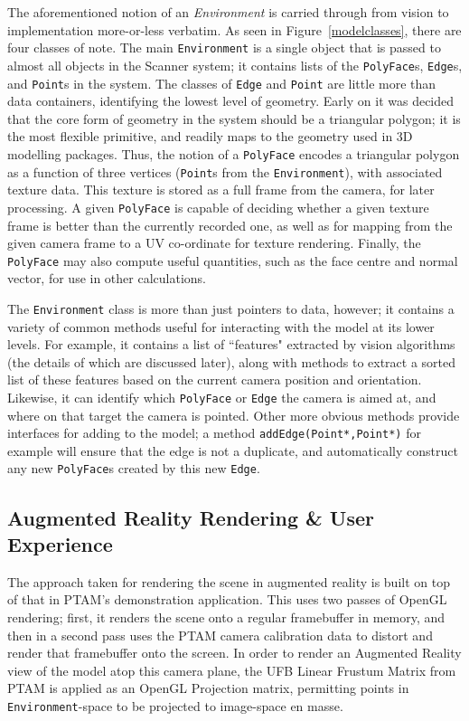 \documentclass[a4paper,10pt]{article}
\begin{document}
The aforementioned notion of an \textit{Environment} is carried through from vision to implementation more-or-less verbatim. As seen in Figure~\ref{modelclasses}, there are four classes of note. The main \texttt{Environment} is a single object that is passed to almost all objects in the Scanner system; it contains lists of the \texttt{PolyFace}s, \texttt{Edge}s, and \texttt{Point}s in the system. The classes of \texttt{Edge} and \texttt{Point} are little more than data containers, identifying the lowest level of geometry. Early on it was decided that the core form of geometry in the system should be a triangular polygon; it is the most flexible primitive, and readily maps to the geometry used in 3D modelling packages. Thus, the notion of a \texttt{PolyFace} encodes a triangular polygon as a function of three vertices (\texttt{Point}s from the \texttt{Environment}), with associated texture data. This texture is stored as a full frame from the camera, for later processing. A given \texttt{PolyFace} is capable of deciding whether a given texture frame is better than the currently recorded one, as well as for mapping from the given camera frame to a UV co-ordinate for texture rendering. Finally, the \texttt{PolyFace} may also compute useful quantities, such as the face centre and normal vector, for use in other calculations.

The \texttt{Environment} class is more than just pointers to data, however; it contains a variety of common methods useful for interacting with the model at its lower levels. For example, it contains a list of ``features" extracted by vision algorithms (the details of which are discussed later), along with methods to extract a sorted list of these features based on the current camera position and orientation. Likewise, it can identify which \texttt{PolyFace} or \texttt{Edge} the camera is aimed at, and where on that target the camera is pointed. Other more obvious methods provide interfaces for adding to the model; a method \texttt{addEdge(Point*,Point*)} for example will ensure that the edge is not a duplicate, and automatically construct any new \texttt{PolyFace}s created by this new \texttt{Edge}.

\subsection{Augmented Reality Rendering \& User Experience}

The approach taken for rendering the scene in augmented reality is built on top of that in PTAM's demonstration application. This uses two passes of OpenGL rendering; first, it renders the scene onto a regular framebuffer in memory, and then in a second pass uses the PTAM camera calibration data to distort and render that framebuffer onto the screen. In order to render an Augmented Reality view of the model atop this camera plane, the UFB Linear Frustum Matrix from PTAM is applied as an OpenGL Projection matrix, permitting points in \texttt{Environment}-space to be projected to image-space en masse.
\end{document}
